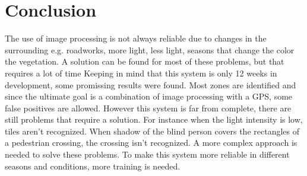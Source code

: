 \section{Conclusion}
The use of image processing is not always reliable due to changes in the surrounding e.g. roadworks, more light, less light, seasons that change the color the vegetation. A solution can be found for most of these problems, but that requires a lot of time
\npar
Keeping in mind that this system is only 12 weeks in development, some promissing results were found.
Most zones are identified and since the ultimate goal is a combination of image processing with a GPS, some false positives are allowed.
\npar
However this system is far from complete, there are still problems that require a solution. For instance when the light intensity is low, tiles aren't recognized. When shadow of the blind person covers the rectangles of a pedestrian crossing, the crossing isn't recognized.
\npar
A more complex approach is needed to solve these problems. To make this system more reliable in different seasons and conditions, more training is needed.